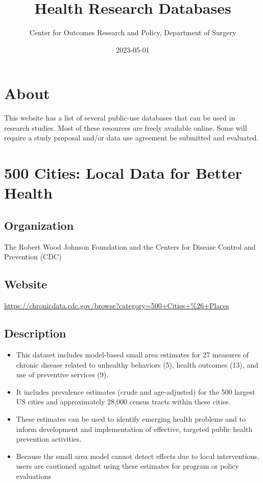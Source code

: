 \documentclass[
]{book}
\title{Health Research Databases}
\author{Center for Outcomes Research and Policy, Department of Surgery}
\date{2023-05-01}
\providecommand{\tightlist}{%
  \setlength{\itemsep}{0pt}\setlength{\parskip}{0pt}}
\begin{document}
\maketitle

{
\setcounter{tocdepth}{1}
\tableofcontents
}
\frontmatter

\hypertarget{about}{%
\chapter*{About}\label{about}}


This website has a list of several public-use databases that can be used in research studies. Most of these resources are freely available online. Some will require a study proposal and/or data use agreement be submitted and evaluated.

\mainmatter

\hypertarget{cities-local-data-for-better-health}{%
\chapter{500 Cities: Local Data for Better Health}\label{cities-local-data-for-better-health}}

\hypertarget{organization}{%
\section{Organization}\label{organization}}

The Robert Wood Johnson Foundation and the Centers for Disease Control and Prevention (CDC)

\hypertarget{website}{%
\section{Website}\label{website}}

\url{https://chronicdata.cdc.gov/browse?category=500+Cities+\%26+Places}

\hypertarget{description}{%
\section{Description}\label{description}}

\begin{itemize}
\tightlist
\item
  This dataset includes model-based small area estimates for 27 measures of chronic disease related to unhealthy behaviors (5), health outcomes (13), and use of preventive services (9).
\item
  It includes prevalence estimates (crude and age-adjusted) for the 500 largest US cities and approximately 28,000 census tracts within these cities.
\item
  These estimates can be used to identify emerging health problems and to inform development and implementation of effective, targeted public health prevention activities.
\item
  Because the small area model cannot detect effects due to local interventions, users are cautioned against using these estimates for program or policy evaluations
\end{itemize}
\end{document}
